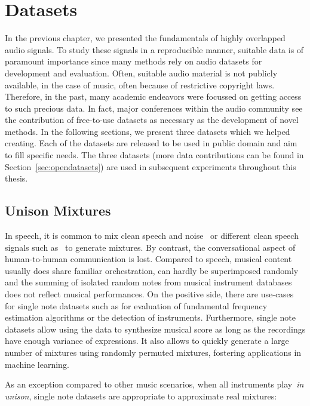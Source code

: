 \chapter{Datasets}
\label{cha:datasets}

In the previous chapter, we presented the fundamentals of highly overlapped audio signals.
To study these signals in a reproducible manner, suitable data is of paramount importance since many methods rely on audio datasets for development and evaluation.
Often, suitable audio material is not publicly available, in the case of music, often because of restrictive copyright laws. 
Therefore, in the past, many academic endeavors were focussed on getting access to such precious data. 
In fact, major conferences within the audio community see the contribution of free-to-use datasets as necessary as the development of novel methods.
In the following sections, we present three datasets which we helped creating. 
Each of the datasets are released to be used in public domain and aim to fill specific needs.
The three datasets (more data contributions can be found in Section~\ref{sec:opendatasets}) are used in subsequent experiments throughout this thesis.

\section{Unison Mixtures}
\label{sec:unison_dataset}


In speech, it is common to mix clean speech and noise~\cite{varga93} or different clean speech signals such as~\cite{garofolo93} to generate mixtures.
By contrast, the conversational aspect of human-to-human communication is lost.
Compared to speech, musical content usually does share familiar orchestration, can hardly be superimposed randomly and the summing of isolated random notes from musical instrument databases does not reflect musical performances.
On the positive side, there are use-cases for single note datasets such as for evaluation of fundamental frequency estimation algorithms or the detection of instruments.
Furthermore, single note datasets allow using the data to synthesize musical score as long as the recordings have enough variance of expressions.
It also allows to quickly generate a large number of mixtures using randomly permuted mixtures, fostering applications in machine learning.

As an exception compared to other music scenarios, when all instruments play~\emph{in unison}, single note datasets are appropriate to approximate real mixtures:

